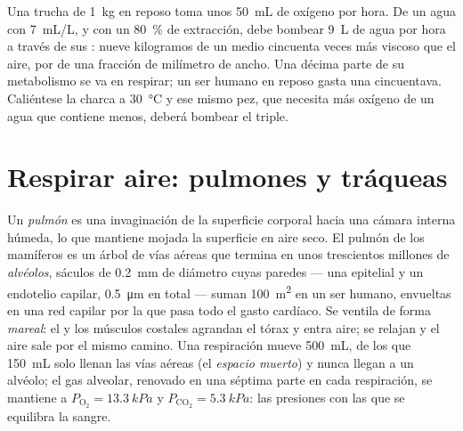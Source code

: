 \begin{example}\label{ex:b1:gas-exchange:priceofwater}
Una trucha de \qty{1}{kg} en reposo toma unos \qty{50}{mL} de oxígeno por
hora. De un agua con \qty{7}{mL/L}, y con un \qty{80}{\%} de extracción,
debe bombear \qty{9}{L} de agua por hora a través de sus : nueve
kilogramos de un medio cincuenta veces más viscoso que el aire, por 
de una fracción de milímetro de ancho. Una décima parte de su metabolismo se
va en respirar; un ser humano en reposo gasta una cincuentava. Caliéntese la
charca a \qty{30}{\celsius} y ese mismo pez, que necesita más oxígeno de un
agua que contiene menos, deberá bombear el triple.
\end{example}

\section{Respirar aire: pulmones y tráqueas}

\begin{definition}\label{def:b1:gas-exchange:lung}
Un \emph{pulmón} es una invaginación de la superficie corporal hacia una
cámara interna húmeda, lo que mantiene mojada la superficie en aire seco. El
pulmón de los mamíferos es un árbol de vías aéreas que termina en unos
trescientos millones de \emph{alvéolos}, sáculos de \qty{0.2}{mm} de
diámetro cuyas paredes --- una  epitelial y un endotelio capilar,
\qty{0.5}{\micro m} en total --- suman \qty{100}{m^2} en un ser humano,
envueltas en una red capilar por la que pasa todo el gasto cardíaco. Se
ventila de forma \emph{mareal}: el  y los músculos costales
agrandan el tórax y entra aire; se relajan y el aire sale por el mismo
camino. Una respiración mueve \qty{500}{mL}, de los que \qty{150}{mL} solo
llenan las vías aéreas (el \emph{espacio muerto}) y nunca llegan a un
alvéolo; el gas alveolar, renovado en una séptima parte en cada respiración,
se mantiene a $P_{\mathrm{O_2}} =
\qty{13.3}{kPa}$ y
$P_{\mathrm{CO_2}} = \qty{5.3}{kPa}$: las presiones con las que se equilibra
la sangre.
\end{definition}

